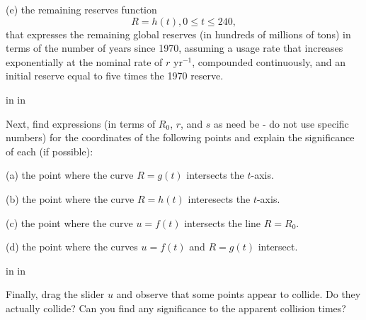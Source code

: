 \documentclass{ximera}
\newcommand{\pskip}{\vskip 0.1 in}
\begin{document}
\begin{question}
(e) the remaining reserves function
\[
    R = h(t) , 0\leq t \leq 240,
\]
that expresses the remaining global reserves (in hundreds of millions of tons) in terms of the number of years since 1970, assuming a usage rate that increases exponentially at the nominal rate of $r \text{ yr}^{-1}$, compounded continuously, and an initial reserve equal to five times the 1970 reserve.

\pskip \pskip

Next, find expressions (in terms of $R_0$, $r$, and $s$ as need be - do not use specific numbers) for the coordinates of the following points and explain the significance of each (if possible):

(a) the point where the curve $R=g(t)$ intersects the $t$-axis.

(b) the point where the curve $R=h(t)$ interesects the $t$-axis.

(c) the point where the curve $u=f(t)$ intersects the line $R=R_0$.

(d) the point where the curves $u=f(t)$ and $R=g(t)$ intersect.

\pskip \pskip

Finally, drag the slider $u$ and observe that some points appear to collide. Do they actually collide? Can you find any significance to the apparent collision times?

\end{question}
\end{document}
